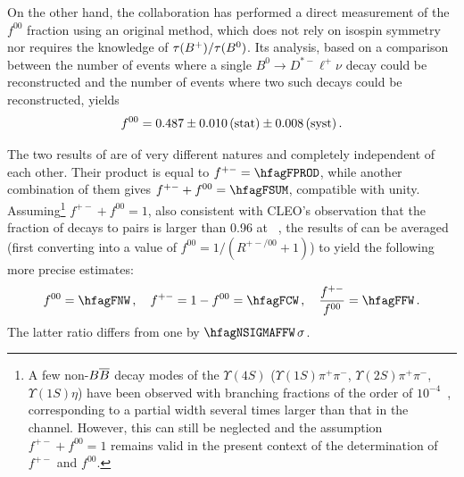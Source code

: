 On the other hand, the \babar collaboration has 
performed a direct measurement of the $f^{00}$ fraction 
using an original method, which does not rely on isospin symmetry nor requires 
the knowledge of $\tau(B^+)/\tau(B^0)$. Its analysis, 
based on a comparison between the number of events where a single 
$B^0 \to D^{*-} \ell^+ \nu$ decay could be reconstructed and the number 
of events where two such decays could be reconstructed, yields~\cite{Aubert:2005bq}
\begin{equation}
f^{00}= 0.487 \pm 0.010\,\mbox{(stat)} \pm 0.008\,\mbox{(syst)} \,.
\labe{fzerozero}
\end{equation}

The two results of  are of very different natures 
and completely independent of each other. 
Their product is equal to $f^{+-} = \hfagFPROD$, 
while another combination of them gives $f^{+-} + f^{00}= \hfagFSUM$, 
compatible with unity.
Assuming\footnote{A few non-$\B\bar{B}$
decay modes of the $\Upsilon(4S)$ 
($\Upsilon(1S)\pi^+\pi^-$,
$\Upsilon(2S)\pi^+\pi^-$, $\Upsilon(1S)\eta$) 
have been observed with branching fractions
of the order of $10^{-4}$~\cite{Aubert:2006bm,*Sokolov:2006sd,*Aubert_mod:2008bv},
corresponding to a partial
width several times larger than that in the \ee channel.
However, this can still be
neglected and the assumption $f^{+-}+f^{00}=1$ remains valid
in the present context of the determination of $f^{+-}$ and $f^{00}$.}
 $f^{+-}+f^{00}= 1$, also consistent with 
CLEO's observation that the fraction of \Ups decays 
to \BB pairs is larger than 0.96 at ~\cite{Barish:1995cx},
the results of 
can be averaged (first converting  
into a value of $f^{00}=1/(R^{+-/00}+1)$) 
to yield the following more precise estimates:
\begin{equation}
f^{00} = \hfagFNW  \,,~~~ f^{+-} = 1 -f^{00} =  \hfagFCW \,,~~~
\frac{f^{+-}}{f^{00}} =  \hfagFFW \,.
\end{equation}
The latter ratio differs from one by $\hfagNSIGMAFFW\,\sigma$.


\newcommand{\fsfive}{\ensuremath{f^{\Upsfive}_{s}}}
\newcommand{\fudfive}{\ensuremath{f^{\Upsfive}_{u,d}}}
\newcommand{\fnBfive}{\ensuremath{f^{\Upsfive}_{B\!\!\!\!/}}}

